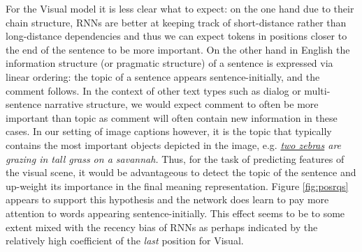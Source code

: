 For the {\sc Visual} model it is less clear what to
expect: on the one hand due to their chain structure,  
RNNs are better at keeping track of
short-distance rather than long-distance dependencies and thus we can expect 
tokens in positions closer to the end of the sentence to be more important. 
On the other hand in English the information structure (or pragmatic structure) 
of a sentence is expressed via linear ordering: the {\sc topic} of a 
sentence appears sentence-initially, and the {\sc comment} follows. 
In the context of other text types such as dialog or multi-sentence \label{edit:topiccomment}
narrative structure, we would expect {\sc comment} to often be more
important than {\sc topic} as {\sc comment} will often 
contain new information in these cases. In our setting of image captions 
however, it is the {\sc topic} that typically contains the most important 
objects depicted in the image, e.g. {\it {\underline{two zebras}} are grazing in tall grass on a savannah.}
Thus, for the task of predicting features of the visual scene, it would 
be advantageous to detect the topic of the sentence and up-weight its
importance in the final meaning representation. Figure \ref{fig:posrqs}
appears to support this hypothesis and the network does 
learn to pay more attention to  words appearing
sentence-initially. This effect seems to be to some extent mixed with the recency
bias of RNNs as perhaps indicated by the relatively high coefficient of the {\it last}
position for {\sc Visual}. 





